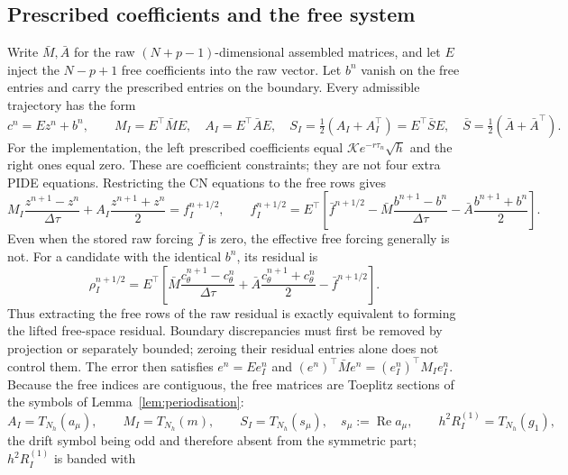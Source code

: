 \documentclass[11pt]{amsart}
\theoremstyle{remark}
\DeclareMathOperator{\Real}{Re}
\newcommand{\Tn}[2]{T_{#1}(#2)}          %
\newcommand{\sym}[1]{#1}                 %
\begin{document}
\subsection{Prescribed coefficients and the free system}
\label{ssec:constrained-system}
Write $\bar M,\bar A$ for the raw $(N+p-1)$-dimensional assembled matrices,
and let $E$ inject the $N-p+1$ free coefficients into the raw vector.
Let $b^n$ vanish on the free entries and carry the prescribed entries on the
boundary. Every admissible trajectory has the form
\[
 c^n=Ez^n+b^n,\qquad
 M_I=E^\top\bar M E,\quad A_I=E^\top\bar A E,\quad
 S_I=\tfrac12(A_I+A_I^\top)=E^\top\bar S E,
 \quad \bar S=\tfrac12(\bar A+\bar A^\top).
\]
For the implementation, the left prescribed coefficients equal
$\mathcal K e^{-r\tau_n}\sqrt h$ and the right ones equal zero. These are
coefficient constraints; they are not four extra PIDE equations.
Restricting the CN equations to the free rows gives
\begin{equation}
 M_I\frac{z^{n+1}-z^n}{\Delta\tau}
 +A_I\frac{z^{n+1}+z^n}{2}=f_I^{n+1/2},\qquad
 f_I^{n+1/2}=E^\top\!\left[\bar f^{n+1/2}
 -\bar M\frac{b^{n+1}-b^n}{\Delta\tau}
 -\bar A\frac{b^{n+1}+b^n}{2}\right].
 \label{eq:constrained-cn}
\end{equation}
Even when the stored raw forcing $\bar f$ is zero, the effective free forcing
generally is not. For a candidate with the identical $b^n$, its residual is
\begin{equation}
 \rho_I^{n+1/2}=E^\top\!\left[\bar M\frac{c_\theta^{n+1}-c_\theta^n}{\Delta\tau}
 +\bar A\frac{c_\theta^{n+1}+c_\theta^n}{2}-\bar f^{n+1/2}\right].
 \label{eq:constrained-residual}
\end{equation}
Thus extracting the free rows of the raw residual is exactly equivalent to
forming the lifted free-space residual. Boundary discrepancies must first be
removed by projection or separately bounded; zeroing their residual entries
alone does not control them. The error then satisfies $e^n=Ee_I^n$ and
$(e^n)^\top\bar M e^n=(e_I^n)^\top M_I e_I^n$.
Because the free indices are contiguous, the free matrices are Toeplitz sections of the
symbols of Lemma~\ref{lem:periodisation}:
\begin{equation}
 A_I=\Tn{N_h}{\sym{a}_\mu},\qquad M_I=\Tn{N_h}{\sym{m}},\qquad
 S_I=\Tn{N_h}{\sym{s}_\mu},\quad \sym{s}_\mu:=\Real\sym{a}_\mu,\qquad
 h^2R^{(1)}_I=\Tn{N_h}{\sym{g}_1},
 \label{eq:sections}
\end{equation}
the drift symbol being odd and therefore absent from the symmetric part; $h^2R^{(1)}_I$ is banded with
\end{document}
